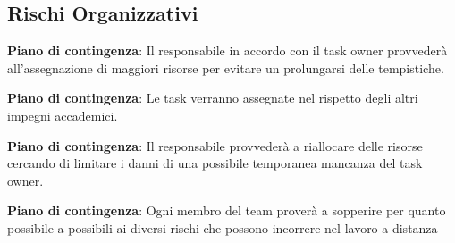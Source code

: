 	\subsection{Rischi Organizzativi}

		\def\productquality{
    			{
        			Calcolo
				Tempistiche e Costi
				RO1,
        			Causa RT1 le valutazioni sulle tempistiche e i costi economici potrebbero essere imprecisi, 
        			Vengono predisposte delle tabelle sulle tempistiche e sarà compito del responsabile monitorare l'andamento dello sviluppo,
        			Occorrenza: Alta 
				Pericolosità: Alta
    			},
		}
		
		\textbf{Piano di contingenza}: Il responsabile in accordo con il task owner provvederà all'assegnazione di maggiori risorse per evitare un prolungarsi delle tempistiche.
		\def\productquality{
			{
        			Impegni
				Accademici
				RO2,
        			Il periodo di sviluppo del progetto inizia a ridosso della sessione d'esami universitaria a cui tutti i membri del gruppo si vedono impegnati in diverse occasioni, 
        			In sede di riunione il team ha deciso di condividere i periodi di tempo in cui il loro contributo al progetto potrebbe calare o venir meno,
        			Occorrenza: Media 
				Pericolosità: Media
    			},
		}
		
		\textbf{Piano di contingenza}: Le task verranno assegnate nel rispetto degli altri impegni accademici.
		\pagebreak
		\def\productquality{
			{
        			Impegni
				Personali
				RO3,
        			è possibile il verificarsi di imprevisti personali che potrebbero influire nel corretto sviluppo del progetto, 
        			è compito di ogni membro del gruppo segnalare un eventuale imprevisto al responsabile del gruppo in modo da permettergli di riorganizzare l'agenda,
        			Occorrenza: Bassa 
				Pericolosità: Bassa
    			},
		}
		
		\textbf{Piano di contingenza}: Il responsabile provvederà a riallocare delle risorse cercando di limitare i danni di una possibile temporanea mancanza del task owner.
		
		\def\productquality{
			{
        			Rischi legati al lavoro a distanza
				RO4,
        			La pandemia covid ci impedisce il lavoro in presenza esponendoci ai rischi del lavoro a distanza, 
        			Malfunzionamenti hardware o instabilità della connessione ad internet non sono fattori di rischio controllabili o pronosticabili,
        			Occorrenza: Bassa 
				Pericolosità: Media
    			},
		}
		
		\textbf{Piano di contingenza}: Ogni membro del team proverà a sopperire per quanto possibile a possibili ai diversi rischi che possono incorrere nel lavoro a distanza



